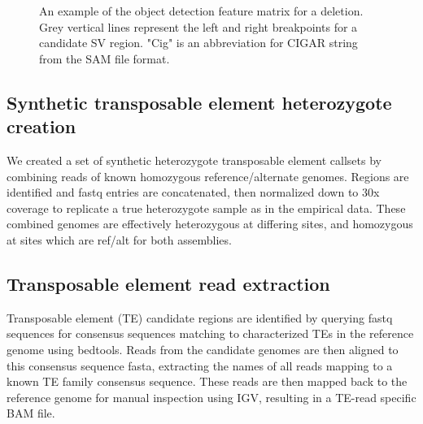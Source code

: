 \begin{figure}
    \centering
    \caption[Sample representations of the object detection feature matrix.]{An example of the object detection feature matrix for a deletion. Grey vertical lines represent the left and right breakpoints for a candidate SV region. "Cig" is an abbreviation for CIGAR string from the SAM file format.}
    \label{fig:example_pileup}
\end{figure}

\subsection{Synthetic transposable element heterozygote creation}
We created a set of synthetic heterozygote transposable element callsets by combining reads of known homozygous reference/alternate genomes. Regions are identified and fastq entries are concatenated, then normalized down to 30x coverage to replicate a true heterozygote sample as in the empirical data. These combined genomes are effectively heterozygous at differing sites, and homozygous at sites which are ref/alt for both assemblies.

\subsection{Transposable element read extraction}

Transposable element (TE) candidate regions are identified by querying fastq sequences for consensus sequences matching to characterized TEs in the reference genome using bedtools. Reads from the candidate genomes are then aligned to this consensus sequence fasta, extracting the names of all reads mapping to a known TE family consensus sequence. These reads are then mapped back to the reference genome for manual inspection using IGV, resulting in a TE-read specific BAM file. 

